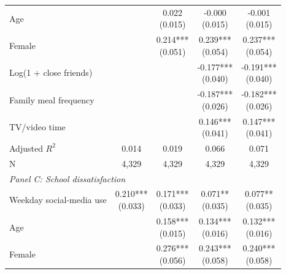 \begin{table}[!htbp]
\begin{tabular}{lcccc}
\\
Age &  & \shortstack[c]{0.022 \\[-0.35ex] (0.015)} & \shortstack[c]{-0.000 \\[-0.35ex] (0.015)} & \shortstack[c]{-0.001 \\[-0.35ex] (0.015)}
\\
Female &  & \shortstack[c]{0.214*** \\[-0.35ex] (0.051)} & \shortstack[c]{0.239*** \\[-0.35ex] (0.054)} & \shortstack[c]{0.237*** \\[-0.35ex] (0.054)}
\\
Log(1 + close friends) &  &  & \shortstack[c]{-0.177*** \\[-0.35ex] (0.040)} & \shortstack[c]{-0.191*** \\[-0.35ex] (0.040)}
\\
Family meal frequency &  &  & \shortstack[c]{-0.187*** \\[-0.35ex] (0.026)} & \shortstack[c]{-0.182*** \\[-0.35ex] (0.026)}
\\
TV/video time &  &  & \shortstack[c]{0.146*** \\[-0.35ex] (0.041)} & \shortstack[c]{0.147*** \\[-0.35ex] (0.041)}
\\
\hline
Adjusted $R^2$ & 0.014 & 0.019 & 0.066 & 0.071
\\
N & 4,329 & 4,329 & 4,329 & 4,329
\\
\hline
\multicolumn{5}{l}{\textit{Panel C: School dissatisfaction}} \\
\hline
Weekday social-media use & \shortstack[c]{0.210*** \\[-0.35ex] (0.033)} & \shortstack[c]{0.171*** \\[-0.35ex] (0.033)} & \shortstack[c]{0.071** \\[-0.35ex] (0.035)} & \shortstack[c]{0.077** \\[-0.35ex] (0.035)}
\\
Age &  & \shortstack[c]{0.158*** \\[-0.35ex] (0.015)} & \shortstack[c]{0.134*** \\[-0.35ex] (0.016)} & \shortstack[c]{0.132*** \\[-0.35ex] (0.016)}
\\
Female &  & \shortstack[c]{0.276*** \\[-0.35ex] (0.056)} & \shortstack[c]{0.243*** \\[-0.35ex] (0.058)} & \shortstack[c]{0.240*** \\[-0.35ex] (0.058)}

\end{tabular}
\end{table}
